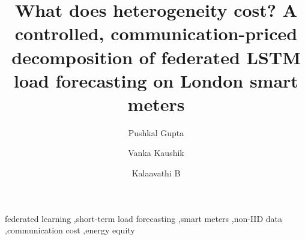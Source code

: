\documentclass[preprint,12pt]{elsarticle}
\begin{document}
\begin{frontmatter}

\title{What does heterogeneity cost? A controlled, communication-priced decomposition of federated LSTM load forecasting on London smart meters}

\author[vit]{Pushkal Gupta}
\author[vit]{Vanka Kaushik}
\author[vit]{Kalaavathi B}



\begin{keyword}
federated learning \sep short-term load forecasting \sep smart meters \sep non-IID data \sep communication cost \sep energy equity
\end{keyword}

\end{frontmatter}

\linenumbers





\end{document}
